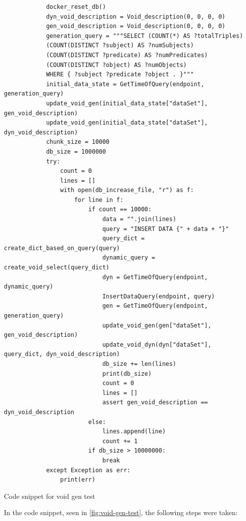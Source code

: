\begin{listing*}[hbt!]
    \begin{verbatim}
            docker_reset_db()
            dyn_void_description = Void_description(0, 0, 0, 0)
            gen_void_description = Void_description(0, 0, 0, 0)
            generation_query = """SELECT (COUNT(*) AS ?totalTriples) 
            (COUNT(DISTINCT ?subject) AS ?numSubjects)
            (COUNT(DISTINCT ?predicate) AS ?numPredicates)
            (COUNT(DISTINCT ?object) AS ?numObjects) 
            WHERE { ?subject ?predicate ?object . }"""
            initial_data_state = GetTimeOfQuery(endpoint, generation_query)
            update_void_gen(initial_data_state["dataSet"], gen_void_description)
            update_void_gen(initial_data_state["dataSet"], dyn_void_description)
            chunk_size = 10000
            db_size = 1000000
            try:
                count = 0
                lines = []
                with open(db_increase_file, "r") as f:
                    for line in f:
                        if count == 10000:
                            data = "".join(lines)
                            query = "INSERT DATA {" + data + "}"
                            query_dict = create_dict_based_on_query(query)
                            dynamic_query = create_void_select(query_dict)
                            dyn = GetTimeOfQuery(endpoint, dynamic_query)
                            InsertDataQuery(endpoint, query)
                            gen = GetTimeOfQuery(endpoint, generation_query)
                            update_void_gen(gen["dataSet"], gen_void_description)
                            update_void_dyn(dyn["dataSet"], query_dict, dyn_void_description)
                            db_size += len(lines)
                            print(db_size)
                            count = 0
                            lines = []
                            assert gen_void_description == dyn_void_description
                        else:
                            lines.append(line)
                            count += 1
                        if db_size > 10000000:
                            break
            except Exception as err:
                print(err)
    \end{verbatim}
    \caption{Code snippet for \gls{void} gen test}
    \label{fig:void-gen-test}
\end{listing*}

In the code snippet, seen in \autoref{fig:void-gen-test}, the following steps were taken:

